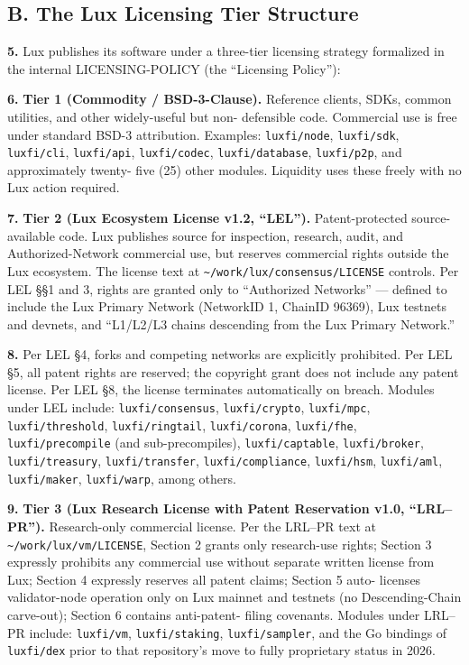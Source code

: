 \documentclass[11pt,letterpaper]{article}
\begin{document}
\subsection*{B. The Lux Licensing Tier Structure}

\textbf{5.} Lux publishes its software under a three-tier licensing
strategy formalized in the internal LICENSING-POLICY (the ``Licensing
Policy''):

\textbf{6.} \textbf{Tier 1 (Commodity / BSD-3-Clause).} Reference
clients, SDKs, common utilities, and other widely-useful but non-
defensible code. Commercial use is free under standard BSD-3
attribution. Examples: \texttt{luxfi/node}, \texttt{luxfi/sdk},
\texttt{luxfi/cli}, \texttt{luxfi/api}, \texttt{luxfi/codec},
\texttt{luxfi/database}, \texttt{luxfi/p2p}, and approximately twenty-
five (25) other modules. Liquidity uses these freely with no Lux
action required.

\textbf{7.} \textbf{Tier 2 (Lux Ecosystem License v1.2, ``LEL'').}
Patent-protected source-available code. Lux publishes source for
inspection, research, audit, and Authorized-Network commercial use,
but reserves commercial rights outside the Lux ecosystem. The license
text at \texttt{\textasciitilde/work/lux/consensus/LICENSE} controls.
Per LEL \S\S 1 and 3, rights are granted only to ``Authorized
Networks'' --- defined to include the Lux Primary Network (NetworkID
1, ChainID 96369), Lux testnets and devnets, and ``L1/L2/L3 chains
descending from the Lux Primary Network.''

\textbf{8.} Per LEL \S 4, forks and competing networks are explicitly
prohibited. Per LEL \S 5, all patent rights are reserved; the
copyright grant does not include any patent license. Per LEL \S 8,
the license terminates automatically on breach. Modules under LEL
include: \texttt{luxfi/consensus}, \texttt{luxfi/crypto},
\texttt{luxfi/mpc}, \texttt{luxfi/threshold}, \texttt{luxfi/ringtail},
\texttt{luxfi/corona}, \texttt{luxfi/fhe}, \texttt{luxfi/precompile}
(and sub-precompiles), \texttt{luxfi/captable}, \texttt{luxfi/broker},
\texttt{luxfi/treasury}, \texttt{luxfi/transfer},
\texttt{luxfi/compliance}, \texttt{luxfi/hsm}, \texttt{luxfi/aml},
\texttt{luxfi/maker}, \texttt{luxfi/warp}, among others.

\textbf{9.} \textbf{Tier 3 (Lux Research License with Patent
Reservation v1.0, ``LRL--PR'').} Research-only commercial license.
Per the LRL--PR text at \texttt{\textasciitilde/work/lux/vm/LICENSE},
Section 2 grants only research-use rights; Section 3 expressly
prohibits any commercial use without separate written license from
Lux; Section 4 expressly reserves all patent claims; Section 5 auto-
licenses validator-node operation only on Lux mainnet and testnets
(no Descending-Chain carve-out); Section 6 contains anti-patent-
filing covenants. Modules under LRL--PR include: \texttt{luxfi/vm},
\texttt{luxfi/staking}, \texttt{luxfi/sampler}, and the Go bindings
of \texttt{luxfi/dex} prior to that repository's move to fully
proprietary status in 2026.
\end{document}
